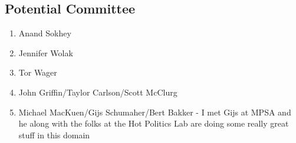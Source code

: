 \documentclass[12pt]{article}
\begin{document}
\subsection{Potential Committee}
\begin{enumerate}
\item Anand Sokhey
\item Jennifer Wolak
\item Tor Wager
\item John Griffin/Taylor Carlson/Scott McClurg
\item Michael MacKuen/Gijs Schumaher/Bert Bakker - I met Gijs at MPSA and he along with the folks at the Hot Politics Lab are doing some really great stuff in this domain
\end{enumerate}

\newpage


\end{document}
